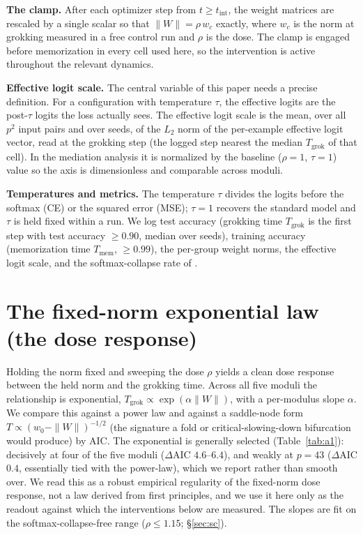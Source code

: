 \textbf{The clamp.} After each optimizer step from $t\ge t_{\mathrm{int}}$, the weight matrices are
rescaled by a single scalar so that $\|W\|=\rho\,w_c$ exactly, where $w_c$ is the norm at grokking measured
in a free control run and $\rho$ is the dose. The clamp is engaged before memorization in every cell used
here, so the intervention is active throughout the relevant dynamics.

\textbf{Effective logit scale.} The central variable of this paper needs a precise definition. For a
configuration with temperature $\tau$, the effective logits are the post-$\tau$ logits the loss actually
sees. The effective logit scale is the mean, over all $p^2$ input pairs and over seeds, of the $L_2$ norm
of the per-example effective logit vector, read at the grokking step (the logged step nearest the median
$T_{\mathrm{grok}}$ of that cell). In the mediation analysis it is normalized by the baseline ($\rho=1$,
$\tau=1$) value so the axis is dimensionless and comparable across moduli.

\textbf{Temperatures and metrics.} The temperature $\tau$ divides the logits before the softmax (CE) or the
squared error (MSE); $\tau=1$ recovers the standard model and $\tau$ is held fixed within a run. We log
test accuracy (grokking time $T_{\mathrm{grok}}$ is the first step with test accuracy $\ge 0.90$, median
over seeds), training accuracy (memorization time $T_{\mathrm{mem}}$, $\ge 0.99$), the per-group weight
norms, the effective logit scale, and the softmax-collapse rate of \citet{prieto2025grokking}.

\section{The fixed-norm exponential law (the dose response)}

Holding the norm fixed and sweeping the dose $\rho$ yields a clean dose response between the held norm and
the grokking time. Across all five moduli the relationship is exponential,
$T_{\mathrm{grok}}\propto\exp(\alpha\|W\|)$, with a per-modulus slope $\alpha$. We compare this against a
power law and against a saddle-node form $T\propto(w_0-\|W\|)^{-1/2}$ (the signature a fold or
critical-slowing-down bifurcation would produce) by AIC. The exponential is generally selected
(Table~\ref{tab:a1}): decisively at four of the five moduli ($\Delta$AIC $4.6$--$6.4$), and weakly at
$p=43$ ($\Delta$AIC $0.4$, essentially tied with the power-law), which we report rather than smooth over.
We read this as a robust empirical regularity of the fixed-norm dose response, not a law derived from
first principles, and we use it here only as the readout against which the interventions below are
measured. The slopes are fit on the softmax-collapse-free range ($\rho\le 1.15$; \S\ref{sec:sc}).

